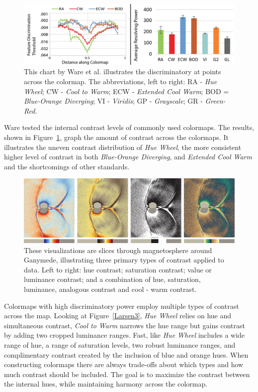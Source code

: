 \documentclass{IEEEcsmag}
\newcommand*{\colormap}[1]{\textsl{#1}\xspace}
\newcommand*{\huewheel}{\colormap{Hue Wheel}}
\newcommand*{\coolwarm}{\colormap{Cool to Warm}}
\newcommand*{\blueorange}{\colormap{Blue-Orange Diverging}}
\newcommand*{\extendedcoolwarm}{\colormap{Extended Cool Warm}}
\begin{document}
\begin{figure}
\includegraphics[width=\linewidth]{pics/Ware17.png}
\caption{This chart by Ware et al. \cite{Ware2017} illustrates the discriminatory at points across the colormap. The abbreviations, left to right: RA - \huewheel; CW - \coolwarm; ECW - \extendedcoolwarm; BOD = \blueorange; VI - \colormap{Viridis}; GP - \colormap{Grayscale}; GR - \colormap{Green-Red}. }
\label{Ware}
\end{figure}

Ware tested the internal contrast levels of commonly used colormaps.
The results, shown in Figure~\ref{Ware}, graph the amount of contrast across the colormaps.
It illustrates the uneven contrast distribution of \huewheel, the more consistent higher level of contrast in both \blueorange, and \extendedcoolwarm and the shortcomings of other standards.

\begin{figure}[t]
\centering
\includegraphics[width=\textwidth]{Final_Pics/HSV.png}
\caption{
  These visualizations are slices through magnetosphere around Ganymede, illustrating three primary types of contrast applied to data.
  Left to right:  hue contrast; saturation contrast; value or luminance contrast; and a combination of hue, saturation, luminance, analogous contrast and cool - warm contrast.
}
\label{contrast}
\end{figure}

Colormaps with high discriminatory power employ multiple types of contrast across the map.
Looking at Figure~\ref{Larsen3}, \huewheel relies on hue and simultaneous contrast, \coolwarm narrows the hue range but gains contrast by adding two cropped luminance ranges.
Fast, like \huewheel includes a wide range of hue, a range of saturation levels, two robust luminance ranges, and complimentary contrast created by the inclusion of blue and orange hues.
When constructing colormaps there are always trade-offs about which types and how much contrast should be included.
The goal is to maximize the contrast between the internal hues, while maintaining harmony across the colormap.
\end{document}
